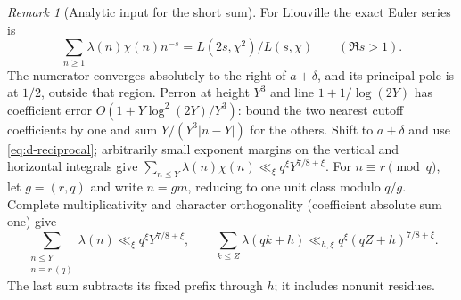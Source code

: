\documentclass[11pt]{article}
\theoremstyle{definition}
\theoremstyle{remark}
\newtheorem{remark}[theorem]{Remark}
\numberwithin{equation}{section}
\begin{document}
\begin{remark}[Analytic input for the short sum]
For Liouville the exact Euler series is
\begin{equation}\label{eq:d-liouville-series}
 \sum_{n\ge1}\lambda(n)\chi(n)n^{-s}=L(2s,\chi^2)/L(s,\chi)\qquad(\Re s>1).
\end{equation}
The numerator converges absolutely to the right of $a+\delta$, and its principal pole is at $1/2$,
outside that region. Perron at height $Y^3$ and line $1+1/\log(2Y)$ has coefficient error
$O(1+Y\log^2(2Y)/Y^3)$: bound the two nearest cutoff coefficients by one and sum
$Y/(Y^3|n-Y|)$ for the others. Shift to $a+\delta$ and use \eqref{eq:d-reciprocal}; arbitrarily
small exponent margins on the vertical and horizontal integrals give
$\sum_{n\le Y}\lambda(n)\chi(n)\ll_\xi q^\xi Y^{7/8+\xi}$.
For $n\equiv r\pmod q$, let $g=(r,q)$ and write $n=gm$, reducing to one unit class modulo $q/g$.
Complete multiplicativity and character orthogonality (coefficient absolute sum one) give
\begin{equation}\label{eq:d-analytic-ap}
 \sum_{\substack{n\le Y\\n\equiv r\ (q)}}\lambda(n)\ll_\xi q^\xi Y^{7/8+\xi},
 \qquad
 \sum_{k\le Z}\lambda(qk+h)\ll_{h,\xi}q^\xi(qZ+h)^{7/8+\xi}.
\end{equation}
The last sum subtracts its fixed prefix through $h$; it includes nonunit residues.
\end{remark}
\end{document}
